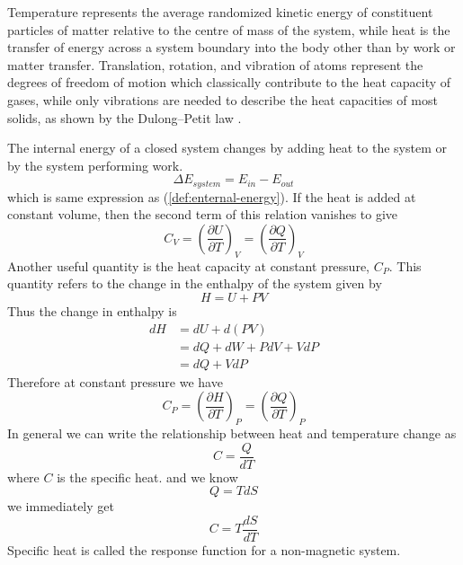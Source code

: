 	Temperature represents the average randomized kinetic energy of constituent particles of matter relative to the centre of mass of the system, while heat is the transfer of energy across a system boundary into the body other than by work or matter transfer. Translation, rotation, and vibration of atoms represent the degrees of freedom of motion which classically contribute to the heat capacity of gases, while only vibrations are needed to describe the heat capacities of most solids, as shown by the Dulong–Petit law \cite{Kittel2004}.
	
	
	The internal energy of a closed system changes by adding heat to the system or by the system performing work.
	\begin{equation}
		\Delta E_{system} = E_{in} - E_{out}
	\end{equation}
	which is same expression as (\ref{def:enternal-energy}). If the heat is added at constant volume, then the second term of this relation vanishes to give
	\begin{equation}
		C_V = \left(\frac{\partial U}{\partial T}\right)_V = \left(\frac{\partial Q}{\partial T}\right)_V
	\end{equation}
	Another useful quantity is the heat capacity at constant pressure, $C_P$. This quantity refers to the change in the enthalpy of the system given by
	\begin{equation}
		H = U + PV
	\end{equation}
	Thus the change in enthalpy is 
	\begin{align}
		dH 
		&= dU + d(PV) \nonumber \\
		&= dQ + dW + PdV + VdP \nonumber \\
		&= dQ  + VdP
	\end{align}
	Therefore at constant pressure we have
	\begin{equation}
		C_P = \left(\frac{\partial H}{\partial T}\right)_P = \left(\frac{\partial Q}{\partial T}\right)_P
	\end{equation}
	In general we can write the relationship between heat and temperature change as
	\begin{equation}
		C = \frac{Q}{dT}
	\end{equation}
	 where $C$ is the specific heat.
	and we know
	\begin{equation}
		Q = T dS
	\end{equation}
	we immediately get
	\begin{equation}
		C = T \frac{dS}{dT}
		\label{def:specific-heat-thermodynamics}
	\end{equation}
	Specific heat is called the response function for a non-magnetic system.
		
